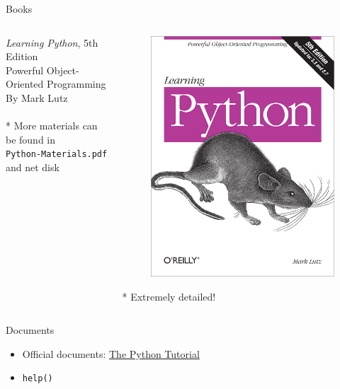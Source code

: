 \documentclass{../TexTemplate/myslide}
\begin{document}
\begin{frame}[fragile]{Books}
\begin{columns}
\begin{column}{0.5\linewidth}
\emph{Learning Python}, 5th Edition\\
Powerful Object-Oriented Programming\\
By Mark Lutz\\
\bigskip
\quad\\
* More materials can be found in\\
\verb'Python-Materials.pdf' and net disk
\end{column}
\begin{column}{0.5\linewidth}
\begin{figure}
\centering
\includegraphics[width=0.8\linewidth]{fig/learning-python.jpg}
\end{figure}
* Extremely detailed!
\end{column}
\end{columns}
\end{frame}

\begin{frame}[fragile]{Documents}
\begin{itemize}
	\item Official documents: \href{https://docs.python.org/3.6/tutorial/index.html}{The Python Tutorial}
	\item \verb'help()'
\end{itemize}
\end{frame}
\end{document}
